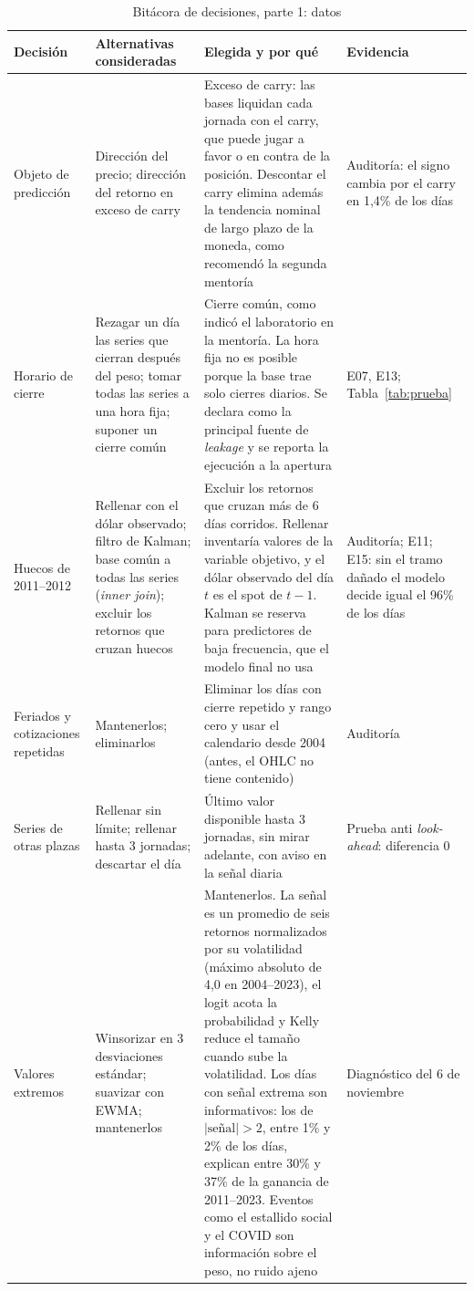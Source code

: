 \documentclass[11pt,a4paper]{article}
\begin{document}
\begin{table}[htbp]\centering\scriptsize
\caption{Bitácora de decisiones, parte 1: datos}\label{tab:bitacora1}
\begin{tabularx}{\textwidth}{@{}>{\raggedright\arraybackslash}p{2.3cm} >{\raggedright\arraybackslash}X >{\raggedright\arraybackslash}X >{\raggedright\arraybackslash}p{2.4cm}@{}}
\toprule
Decisión & Alternativas consideradas & Elegida y por qué & Evidencia \\
\midrule
Objeto de predicción & Dirección del precio; dirección del retorno en exceso de carry & Exceso de carry: las bases liquidan cada jornada con el carry, que puede jugar a favor o en contra de la posición. Descontar el carry elimina además la tendencia nominal de largo plazo de la moneda, como recomendó la segunda mentoría & Auditoría: el signo cambia por el carry en 1,4\% de los días \\
Horario de cierre & Rezagar un día las series que cierran después del peso; tomar todas las series a una hora fija; suponer un cierre común & Cierre común, como indicó el laboratorio en la mentoría. La hora fija no es posible porque la base trae solo cierres diarios. Se declara como la principal fuente de \emph{leakage} y se reporta la ejecución a la apertura & E07, E13; Tabla~\ref{tab:prueba} \\
Huecos de 2011--2012 & Rellenar con el dólar observado; filtro de Kalman; base común a todas las series (\emph{inner join}); excluir los retornos que cruzan huecos & Excluir los retornos que cruzan más de 6 días corridos. Rellenar inventaría valores de la variable objetivo, y el dólar observado del día \(t\) es el spot de \(t-1\). Kalman se reserva para predictores de baja frecuencia, que el modelo final no usa & Auditoría; E11; E15: sin el tramo dañado el modelo decide igual el 96\% de los días \\
Feriados y cotizaciones repetidas & Mantenerlos; eliminarlos & Eliminar los días con cierre repetido y rango cero y usar el calendario desde 2004 (antes, el OHLC no tiene contenido) & Auditoría \\
Series de otras plazas & Rellenar sin límite; rellenar hasta 3 jornadas; descartar el día & Último valor disponible hasta 3 jornadas, sin mirar adelante, con aviso en la señal diaria & Prueba anti \emph{look-ahead}: diferencia 0 \\
Valores extremos & Winsorizar en 3 desviaciones estándar; suavizar con EWMA; mantenerlos & Mantenerlos. La señal es un promedio de seis retornos normalizados por su volatilidad (máximo absoluto de 4,0 en 2004--2023), el logit acota la probabilidad y Kelly reduce el tamaño cuando sube la volatilidad. Los días con señal extrema son informativos: los de \(|\text{señal}|>2\), entre 1\% y 2\% de los días, explican entre 30\% y 37\% de la ganancia de 2011--2023. Eventos como el estallido social y el COVID son información sobre el peso, no ruido ajeno & Diagnóstico del 6 de noviembre \\

\end{tabularx}
\end{table}
\end{document}
